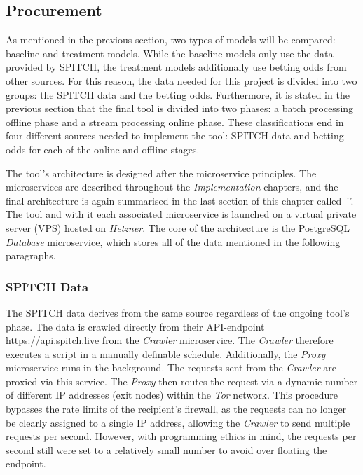 \subsection{Procurement}

As mentioned in the previous section, two types of models will be compared: baseline and treatment models. While the baseline models only use the data provided by SPITCH, the treatment models additionally use betting odds from other sources. For this reason, the data needed for this project is divided into two groups: the SPITCH data and the betting odds. Furthermore, it is stated in the previous section that the final tool is divided into two phases: a batch processing offline phase and a stream processing online phase. These classifications end in four different sources needed to implement the tool: SPITCH data and betting odds for each of the online and offline stages.

The tool's architecture is designed after the microservice principles. The microservices are described throughout the \emph{Implementation} chapters, and the final architecture is again summarised in the last section of this chapter called \emph{''}. The tool and with it each associated microservice is launched on a virtual private server (VPS) hosted on \emph{Hetzner}. \parencite[see][]{hetzner_about_2021} The core of the architecture is the PostgreSQL \emph{Database} microservice, which stores all of the data mentioned in the following paragraphs.

\subsubsection{SPITCH Data}

The SPITCH data derives from the same source regardless of the ongoing tool's phase. The data is crawled directly from their API-endpoint \underline{https://api.spitch.live} from the \emph{Crawler} microservice. The \emph{Crawler} therefore executes a script in a manually definable schedule. Additionally, the \emph{Proxy} microservice runs in the background. The requests sent from the \emph{Crawler} are proxied via this service. The \emph{Proxy} then routes the request via a dynamic number of different IP addresses (exit nodes) within the \emph{Tor} network. This procedure bypasses the rate limits of the recipient's firewall, as the requests can no longer be clearly assigned to a single IP address, allowing the \emph{Crawler} to send multiple requests per second. However, with programming ethics in mind, the requests per second still were set to a relatively small number to avoid over floating the endpoint.

